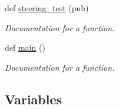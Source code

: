 \begin{DoxyCompactItemize}
def \mbox{\hyperlink{namespacesteering__response__test_a47db8892f945cf998a098d03b6dbf3e6}{steering\+\_\+test}} (pub)
\begin{DoxyCompactList}\small\item\em Documentation for a function. \end{DoxyCompactList}\item 
def \mbox{\hyperlink{namespacesteering__response__test_a0f50f1d8b27e70116ceea74c874a5ea2}{main}} ()
\begin{DoxyCompactList}\small\item\em Documentation for a function. \end{DoxyCompactList}\end{DoxyCompactItemize}
\subsection*{Variables}
